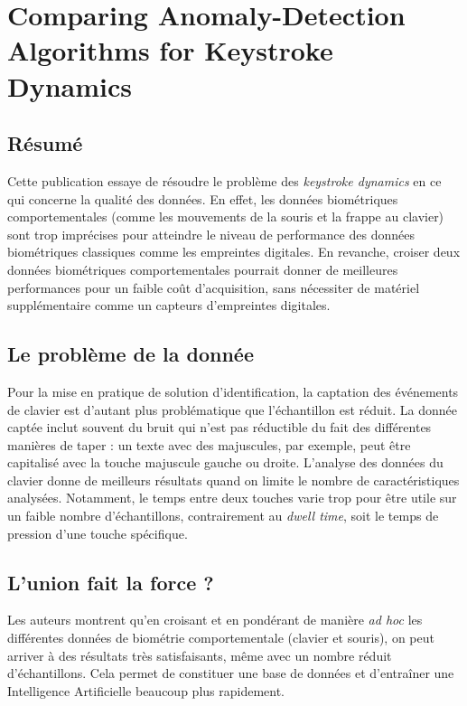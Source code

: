 \section{Comparing Anomaly-Detection Algorithms for Keystroke Dynamics\cite{panasiuk2016}}


\subsection{Résumé}
Cette publication essaye de résoudre le problème des \textit{keystroke dynamics} en ce qui concerne la qualité des données. En effet, les données biométriques comportementales (comme les mouvements de la souris et la frappe au clavier) sont trop imprécises pour atteindre le niveau de performance des données biométriques classiques comme les empreintes digitales. En revanche, croiser deux données biométriques comportementales pourrait donner de meilleures performances pour un faible coût d'acquisition, sans nécessiter de matériel supplémentaire comme un capteurs d'empreintes digitales.

\subsection{Le problème de la donnée}
Pour la mise en pratique de solution d'identification, la captation des événements de clavier est d'autant plus problématique que l'échantillon est réduit. La donnée captée inclut souvent du bruit qui n'est pas réductible du fait des différentes manières de taper : un texte avec des majuscules, par exemple, peut être capitalisé avec la touche majuscule gauche ou droite. L'analyse des données du clavier donne de meilleurs résultats quand on limite le nombre de caractéristiques analysées. Notamment, le temps entre deux touches varie trop pour être utile sur un faible nombre d'échantillons, contrairement au \textit{dwell time}, soit le temps de pression d'une touche spécifique.

\subsection{L'union fait la force ?}
Les auteurs montrent qu'en croisant et en pondérant de manière \textit{ad hoc} les différentes données de biométrie comportementale (clavier et souris), on peut arriver à des  résultats très satisfaisants, même avec un nombre réduit d'échantillons. Cela permet de constituer une base de données et d'entraîner une Intelligence Artificielle beaucoup plus rapidement. 

